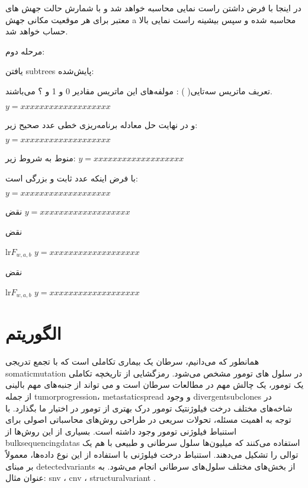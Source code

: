 در اینجا با فرض داشتن   راست نمایی محاسبه خواهد شد و    با شمارش حالت جهش های معتبر برای هر موقعیت مکانی جهش a محاسبه شده و سپس بیشینه راست نمایی بالا حساب خواهد شد. 

مرحله دوم:  

یافتن \gls{subtrees} پایش‌شده: 

تعریف ماتریس سه‌تایی( ) : مولفه‌های این ماتریس مقادیر 0 و 1 و ؟ می‌باشند.

\begin{math}
	y=xxxxxxxxxxxxxxxxxxx
\end{math}

و در نهایت حل معادله برنامه‌ریزی خطی عدد صحیح زیر: 

\begin{math}
	y=xxxxxxxxxxxxxxxxxxx
\end{math}


منوط به شروط زیر: 
\begin{math}
	y=xxxxxxxxxxxxxxxxxxx
\end{math}


با فرض اینکه  عدد ثابت و بزرگی است: 

\begin{math}
	y=xxxxxxxxxxxxxxxxxxx
\end{math}


نقض 
\begin{math}
	y=xxxxxxxxxxxxxxxxxxx
\end{math}


نقض 

lr{$F_{w,a,b}$}
\begin{math}
	y=xxxxxxxxxxxxxxxxxxx
\end{math}


نقض 

lr{$F_{w,a,b}$}
\begin{math}
	y=xxxxxxxxxxxxxxxxxxx
\end{math}


\section{الگوریتم   \cite{azer2020tumor}}

همانطور که می‌دانیم، سرطان یک بیماری تکاملی است که با تجمع تدریجی \gls{somaticmutation} در سلول های تومور مشخص می‌شود. رمزگشایی از تاریخچه تکاملی یک تومور، یک چالش مهم در مطالعات سرطان است و می تواند از جنبه‌های مهم بالینی از جمله \gls{tumorprogression}،  \gls{metastaticspread} و وجود \gls{divergentsubclones} در شاخه‌های مختلف درخت فیلوژنتیک تومور درک بهتری از تومور در اختیار ما بگذارد. با توجه به اهمیت مسئله، تحولات سریعی در طراحی روش‌های محاسباتی اصولی برای استنباط فیلوژنی تومور وجود داشته است.  بسیاری از این روش‌ها از \glspl{bulksequencingdata} استفاده می‌کنند که  میلیون‌ها سلول سرطانی و طبیعی با هم یک توالی را تشکیل می‌دهند. استنباط درخت فیلوژنی با استفاده از این نوع داده‌ها، معمولاً بر مبنای \gls{detectedvariants} از بخش‌های مختلف سلول‌های سرطانی انجام می‌شود. به عنوان مثال:
 \gls{snv} \cite{strino2013trap, el2015reconstruction, malikic2020studying, donmez2016clonality, satas2017tumor, husic2019mipup}،  \gls{cnv} \cite{zaccaria2017copy}، \gls{structuralvariant} \cite{eaton2018deconvolution, ricketts2020meltos}.
 
